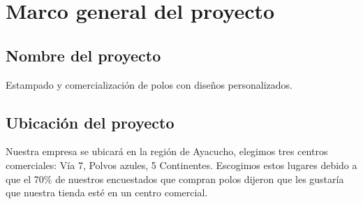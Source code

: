 \documentclass[a4paper,openright,12pt]{book}
\begin{document}







\chapter{Marco general del proyecto}\label{cap.1}

\section{Nombre del proyecto}

Estampado y comercialización de polos con diseños personalizados.

\section{Ubicación del proyecto}

Nuestra empresa se ubicará en la región de Ayacucho, elegimos tres centros comerciales: Vía 7, Polvos azules, 5 Continentes. Escogimos estos lugares debido a que el 70\% de nuestros encuestados que compran polos dijeron que les gustaría que nuestra tienda esté en un centro comercial.
\end{document}
